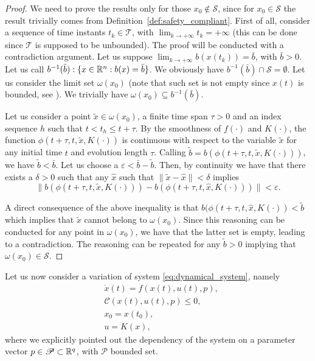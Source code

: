 \documentclass[letterpaper, 10 pt, conference]{ieeeconf}
\newcounter{Definition}
\theoremstyle{definition}
\theoremstyle{nopoint}
\newcommand{\tildeAdd}{~}
\begin{document}
 
 
  \begin{proof}
We need to prove the results only for those $x_0\notin \mathcal{S}$, since for $x_0\in\mathcal{S}$ the result trivially comes from Definition\tildeAdd\ref{def:safety_compliant}.
First of all, consider a sequence of time instants $t_k\in \mathcal{T}$,  with $\lim_{k\rightarrow +\infty} t_k=+\infty$ (this can be done since $\mathcal{T}$ is supposed to be unbounded).
The proof will be conducted with a contradiction argument.
Let us suppose $\lim_{k \rightarrow +\infty} b(x(t_k))=\bar{b}$, with $\bar{b}>0$. Let us call $b^{-1}(	\bar{b}):\{x\in\Bbb{R}^n: b(x)=\bar{b}\}$. 
We obviously have $b^{-1} (\bar{b})\cap \mathcal{S}=\emptyset$. Let us consider the limit set $\omega(x_0)$ (note that such set is not empty since $x(t)$ is bounded, see \cite{khalil}). We trivially have $\omega(x_0)\subseteq b^{-1} (\bar{b})$.

Let us consider a point $\tilde{x}\in\omega(x_0)$, a finite time span $\tau >0$ and an index sequence $h$ such that $t<t_h\leq t+\tau$. By the smoothness of $f(\cdot)$ and $K(\cdot)$, the function $\phi(t+\tau, t, \tilde{x}, K(\cdot))$ is continuous with respect to the variable $\tilde{x}$ for any initial time $t$ {and evolution} length $\tau$.
Calling $\tilde{b}=b(\phi(t+\tau, t, \tilde{x}, K(\cdot)))$, we have $\tilde{b}<\bar{b}$.
Let us choose a $\varepsilon<\bar{b}-\tilde{b}$. Then, by continuity we have that there exists a $\delta >0$ such that any $\hat{x}$ such that $\|\tilde{x}-\hat{x}\|<\delta$ implies 
\begin{equation*}
\|b(\phi(t+\tau, t, \tilde{x}, K(\cdot)))-b(\phi(t+\tau, t, \hat{x}, K(\cdot)))\|<\varepsilon.
\end{equation*}

A direct consequence of the above inequality is that 
$b(\phi(t+\tau, t, \hat{x}, K(\cdot))<\tilde{b}$ which implies that $\tilde{x}$ cannot belong to $\omega(x_0)$. Since this reasoning can be conducted for any point in $\omega(x_0)$, we have that the latter set is empty, leading to a contradiction. The reasoning can be repeated for any $\tilde{b}>0$ implying that $\omega(x_0)\in\mathcal{S}$.
 
\end{proof}








Let us now consider a variation of system \eqref{eq:dynamical_system}, namely 
\begin{subequations}\label{eq:dynamical_system_param}
\begin{align}
	& \dot{x}(t) = f(x(t), u(t),p),\\
	& \mathcal{C}(x(t),u(t),p)\leq 0,\\
	& x_0=x(t_0), \\
	& u = K(x),
\end{align}
\end{subequations}
where we explicitly pointed out the dependency of the system on a parameter vector $p\in \mathcal{P}\subset \Bbb{R}^q$, with $\mathcal{P}$ bounded set. 
\end{document}
